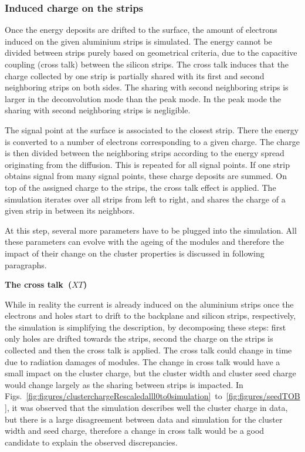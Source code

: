 
\subsubsection{Induced charge on the strips~\label{sec:induce}}

Once the energy deposits are drifted to the surface, the amount of electrons induced on the given aluminium strips is simulated. The energy cannot be divided between strips purely based on geometrical criteria, due to the capacitive coupling (cross talk) between the silicon strips. The cross talk induces that the charge collected by one strip is partially shared with its first and second neighboring strips on both sides. The sharing with second neighboring strips is larger in the deconvolution mode than the peak mode. In the peak mode the sharing with second neighboring strips is negligible.   

The signal point at the surface is associated to the closest strip. There the energy is converted to a number of electrons corresponding to a given charge. The charge is then divided between the neighboring strips according to the energy spread originating from the diffusion. This is repeated for all signal points. If one strip obtains signal from many signal points, these charge deposits are summed. On top of the assigned charge to the strips, the cross talk effect is applied. The simulation iterates over all strips from left to right, and shares the charge of a given strip in between its neighbors.

At this step, several more parameters have to be plugged into the simulation. All these parameters can evolve with the ageing of the modules and therefore the impact of their change on the cluster properties is discussed in following paragraphs. 

\textbf{The cross talk~($XT$)}

While in reality the current is already induced on the aluminium strips once the electrons and holes start to drift to the backplane and silicon strips, respectively, the simulation is simplifying the description, by decomposing these steps: first only holes are drifted towards the strips, second the charge on the strips is collected and then the cross talk is applied. The cross talk could change in time due to radiation damages of modules. The change in cross talk would have a small impact on the cluster charge, but the cluster width and cluster seed charge would change largely as the sharing between strips is impacted. In Figs.~\ref{fig:figures/clusterchargeRescaledalll0to0simulation}~to~\ref{fig:figures/seedTOB}, it was observed that the simulation describes well the cluster charge in data, but there is a large disagreement between data and simulation for the cluster width and seed charge, therefore a change in cross talk would be a good candidate to explain the observed discrepancies.  

